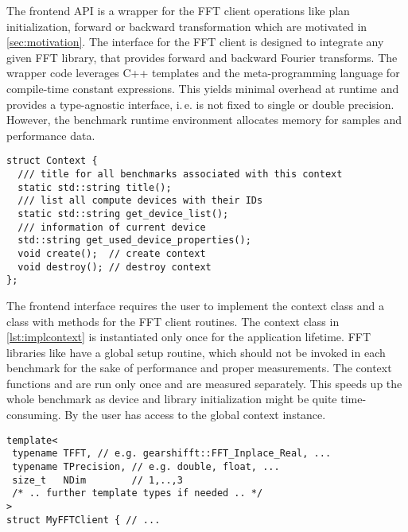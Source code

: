 The frontend API is a wrapper for the FFT client operations like plan initialization, forward or backward transformation which are motivated in \cref{sec:motivation}.
The interface for the FFT client is designed to integrate any given FFT library, that provides forward and backward Fourier transforms.
The wrapper code leverages C++ templates and the meta-programming language for compile-time constant expressions.
This yields minimal overhead at runtime and provides a type-agnostic interface, i.\,e. \gearshifft{} is not fixed to single or double precision.
However, the benchmark runtime environment allocates memory for samples and performance data.

\begin{lstlisting}[caption={Context class required by gearshifft frontend API},label={lst:implcontext}]
struct Context {
  /// title for all benchmarks associated with this context
  static std::string title();
  /// list all compute devices with their IDs
  static std::string get_device_list();
  /// information of current device
  std::string get_used_device_properties();
  void create();  // create context
  void destroy(); // destroy context
};
\end{lstlisting}

The frontend interface requires the user to implement the context class and a class with methods for the FFT client routines.
The context class in \cref{lst:implcontext} is instantiated only once for the application lifetime.
FFT libraries like \clfft{} have a global setup routine, which should not be invoked in each benchmark for the sake of performance and proper measurements. 
The context functions  and  are run only once and are measured separately.
This speeds up the whole benchmark as device and library initialization might be quite time-consuming. 
By  the user has access to the global context instance.

\begin{lstlisting}[caption={Required template arguments for FFT client implementation},label={lst:implfft_templ}]
template<
 typename TFFT, // e.g. gearshifft::FFT_Inplace_Real, ...
 typename TPrecision, // e.g. double, float, ...
 size_t   NDim        // 1,..,3
 /* .. further template types if needed .. */
>
struct MyFFTClient { // ...
\end{lstlisting}

